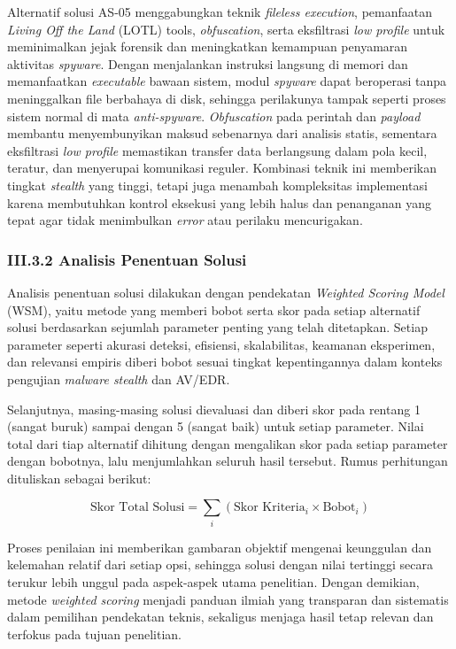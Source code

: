 Alternatif solusi AS-05 menggabungkan teknik \textit{fileless execution}, 
pemanfaatan \textit{Living Off the Land} (LOTL) tools, \textit{obfuscation}, serta 
eksfiltrasi \textit{low profile} untuk meminimalkan jejak forensik dan meningkatkan 
kemampuan penyamaran aktivitas \textit{spyware}. Dengan menjalankan instruksi 
langsung di memori dan memanfaatkan \textit{executable} bawaan sistem, modul 
\textit{spyware} dapat beroperasi tanpa meninggalkan file berbahaya di disk, 
sehingga perilakunya tampak seperti proses sistem normal di mata 
\textit{anti-spyware}. \textit{Obfuscation} pada perintah dan \textit{payload} membantu 
menyembunyikan maksud sebenarnya dari analisis statis, sementara eksfiltrasi 
\textit{low profile} memastikan transfer data berlangsung dalam pola kecil, teratur, 
dan menyerupai komunikasi reguler. Kombinasi teknik ini memberikan tingkat 
\textit{stealth} yang tinggi, tetapi juga menambah kompleksitas implementasi karena 
membutuhkan kontrol eksekusi yang lebih halus dan penanganan yang tepat agar 
tidak menimbulkan \textit{error} atau perilaku mencurigakan.

\subsubsection*{III.3.2 Analisis Penentuan Solusi}

Analisis penentuan solusi dilakukan dengan pendekatan \textit{Weighted Scoring Model} 
(WSM), yaitu metode yang memberi bobot serta skor pada setiap alternatif solusi 
berdasarkan sejumlah parameter penting yang telah ditetapkan. Setiap parameter seperti 
akurasi deteksi, efisiensi, skalabilitas, keamanan eksperimen, dan relevansi empiris 
diberi bobot sesuai tingkat kepentingannya dalam konteks pengujian \textit{malware stealth} 
dan AV/EDR.

Selanjutnya, masing-masing solusi dievaluasi dan diberi skor pada rentang 1 (sangat buruk) 
sampai dengan 5 (sangat baik) untuk setiap parameter. Nilai total dari tiap alternatif 
dihitung dengan mengalikan skor pada setiap parameter dengan bobotnya, lalu menjumlahkan 
seluruh hasil tersebut. Rumus perhitungan dituliskan sebagai berikut:

\[
\text{Skor Total Solusi} = \sum_{i} \left( \text{Skor Kriteria}_i \times \text{Bobot}_i \right)
\]

Proses penilaian ini memberikan gambaran objektif mengenai keunggulan dan kelemahan relatif 
dari setiap opsi, sehingga solusi dengan nilai tertinggi secara terukur lebih unggul pada 
aspek-aspek utama penelitian. Dengan demikian, metode \textit{weighted scoring} menjadi panduan 
ilmiah yang transparan dan sistematis dalam pemilihan pendekatan teknis, sekaligus menjaga hasil 
tetap relevan dan terfokus pada tujuan penelitian.

